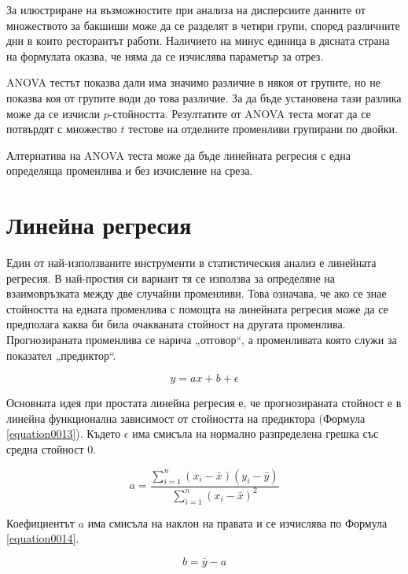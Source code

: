 За илюстриране на възможностите при анализа на дисперсиите данните от множеството за бакшиши може да се разделят в четири групи, според различните дни в които ресторантът работи. Наличието на минус единица в дясната страна на формулата оказва, че няма да се изчислява параметър за отрез. 

ANOVA тестът показва дали има значимо различие в някоя от групите, но не показва коя от групите води до това различие. За да бъде установена тази разлика може да се изчисли $p$-стойността. Резултатите от ANOVA теста могат да се потвърдят с множество $t$ тестове на отделните променливи групирани по двойки. 

Алтернатива на ANOVA теста може да бъде линейната регресия с една определяща променлива и без изчисление на среза.

\section{Линейна регресия}

Един от най-използваните инструменти в статистическия анализ е линейната регресия. В най-простия си вариант тя се използва за определяне на взаимовръзката между две случайни променливи. Това означава, че ако се знае стойността на едната променлива с помощта на линейната регресия може да се предполага каква би била очакваната стойност на другата променлива. Прогнозираната променлива се нарича „отговор“, а променливата която служи за показател „предиктор“. 

\begin{equation}
y = ax + b + \epsilon
\label{equation0013}
\end{equation}

Основната идея при простата линейна регресия е, че прогнозираната стойност е в линейна функционална зависимост от стойността на предиктора (Формула \ref{equation0013}). Където $\epsilon$ има смисъла на нормално разпределена грешка със средна стойност 0.

\begin{equation}
\label{equation0014}
a = \frac{ \sum_{i=1}^{n}(x_i-\bar{x})(y_i-\bar{y}) }{ \sum_{i=1}^{n}(x_i-\bar{x})^2 }
\end{equation}

Коефициентът $a$ има смисъла на наклон на правата и се изчислява по Формула \ref{equation0014}.

\begin{equation}
b = \bar{y} - a
\label{equation0015}
\end{equation}

